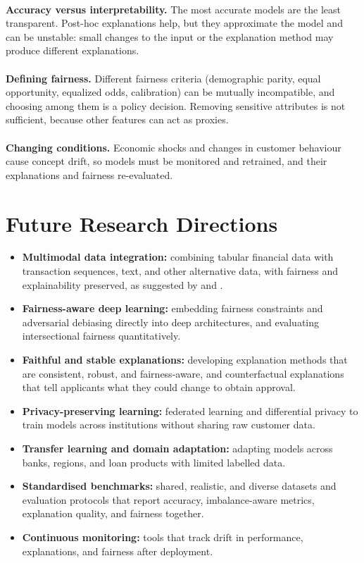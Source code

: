 \documentclass[12pt,a4paper,final]{extreport}
\begin{document}
\paragraph{} \textbf{Accuracy versus interpretability.} The most accurate models are the least transparent. Post-hoc explanations help, but they approximate the model and can be unstable: small changes to the input or the explanation method may produce different explanations.

\paragraph{} \textbf{Defining fairness.} Different fairness criteria (demographic parity, equal opportunity, equalized odds, calibration) can be mutually incompatible, and choosing among them is a policy decision. Removing sensitive attributes is not sufficient, because other features can act as proxies.

\paragraph{} \textbf{Changing conditions.} Economic shocks and changes in customer behaviour cause concept drift, so models must be monitored and retrained, and their explanations and fairness re-evaluated.

\section{Future Research Directions}

\begin{itemize}
  \item \textbf{Multimodal data integration:} combining tabular financial data with transaction sequences, text, and other alternative data, with fairness and explainability preserved, as suggested by \cite{p1} and \cite{p4}.
  \item \textbf{Fairness-aware deep learning:} embedding fairness constraints and adversarial debiasing directly into deep architectures, and evaluating intersectional fairness quantitatively.
  \item \textbf{Faithful and stable explanations:} developing explanation methods that are consistent, robust, and fairness-aware, and counterfactual explanations that tell applicants what they could change to obtain approval.
  \item \textbf{Privacy-preserving learning:} federated learning and differential privacy to train models across institutions without sharing raw customer data.
  \item \textbf{Transfer learning and domain adaptation:} adapting models across banks, regions, and loan products with limited labelled data.
  \item \textbf{Standardised benchmarks:} shared, realistic, and diverse datasets and evaluation protocols that report accuracy, imbalance-aware metrics, explanation quality, and fairness together.
  \item \textbf{Continuous monitoring:} tools that track drift in performance, explanations, and fairness after deployment.
\end{itemize}
\end{document}
